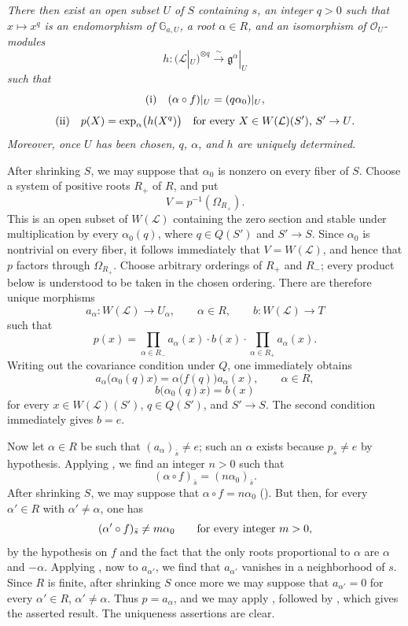\textit{There then exist an open subset \(U\) of \(S\) containing
\(s\), an integer \(q>0\) such that \(x\mapsto x^q\) is an
endomorphism of \(\mathbb G_{a,U}\), a root \(\alpha\in R\), and an
isomorphism of \(\mathcal O_U\)-modules}
\[
  h:(\mathcal L|_U)^{\otimes q}
  \xrightarrow{\;\sim\;}
  \mathfrak g^\alpha|_U
\]
\textit{such that}
\[
  \textup{(i)}\quad
  (\alpha\circ f)|_U=(q\alpha_0)|_U,
\]
\[
  \textup{(ii)}\quad
  p(X)=\exp_\alpha\bigl(h(X^q)\bigr)
  \quad\textup{for every \(X\in W(\mathcal L)(S')\), \(S'\to U\).}
\]
\textit{Moreover, once \(U\) has been chosen, \(q\), \(\alpha\),
and \(h\) are uniquely determined.}

After shrinking \(S\), we may suppose that \(\alpha_0\) is nonzero
on every fiber of \(S\). Choose a system of positive roots \(R_+\)
of \(R\), and put
\[
  V=p^{-1}(\Omega_{R_+}).
\]
This is an open subset of \(W(\mathcal L)\) containing the zero
section and stable under multiplication by every
\(\alpha_0(q)\), where \(q\in Q(S')\) and \(S'\to S\). Since
\(\alpha_0\) is nontrivial on every fiber, it follows immediately
that \(V=W(\mathcal L)\), and hence that \(p\) factors through
\(\Omega_{R_+}\). Choose arbitrary orderings of \(R_+\) and
\(R_-\); every product below is understood to be taken in the
chosen ordering. There are therefore unique morphisms
\[
  a_\alpha:W(\mathcal L)\longrightarrow U_\alpha,
  \qquad \alpha\in R,
  \qquad
  b:W(\mathcal L)\longrightarrow T
\]
such that
\[
  p(x)
  =
  \prod_{\alpha\in R_-}a_\alpha(x)\mathbin{\cdot}b(x)
  \mathbin{\cdot}\prod_{\alpha\in R_+}a_\alpha(x).
\]
Writing out the covariance condition under \(Q\), one immediately
obtains
\[
  a_\alpha\bigl(\alpha_0(q)x\bigr)
  =
  \alpha\bigl(f(q)\bigr)a_\alpha(x),
  \qquad \alpha\in R,
\]
\[
  b\bigl(\alpha_0(q)x\bigr)=b(x)
\]
for every \(x\in W(\mathcal L)(S')\), \(q\in Q(S')\), and
\(S'\to S\). The second condition immediately gives \(b=e\).

Now let \(\alpha\in R\) be such that
\((a_\alpha)_{\bar s}\ne e\); such an \(\alpha\) exists because
\(p_{\bar s}\ne e\) by hypothesis. Applying ,
we find an integer \(n>0\) such that
\[
  (\alpha\circ f)_{\bar s}=(n\alpha_0)_{\bar s}.
\]
After shrinking \(S\), we may suppose that
\(\alpha\circ f=n\alpha_0\) (). But then, for every
\(\alpha'\in R\) with \(\alpha'\ne\alpha\), one has
\[
  (\alpha'\circ f)_{\bar s}\ne m\alpha_0
  \qquad\textup{for every integer \(m>0\),}
\]
by the hypothesis on \(f\) and the fact that the only roots
proportional to \(\alpha\) are \(\alpha\) and \(-\alpha\).
Applying , now to \(a_{\alpha'}\), we find that
\(a_{\alpha'}\) vanishes in a neighborhood of \(s\).
Since \(R\) is finite, after shrinking \(S\) once more we may
suppose that \(a_{\alpha'}=0\) for every
\(\alpha'\in R\), \(\alpha'\ne\alpha\). Thus \(p=a_\alpha\), and
we may apply , followed by , which gives
the asserted result. The uniqueness assertions are clear.

